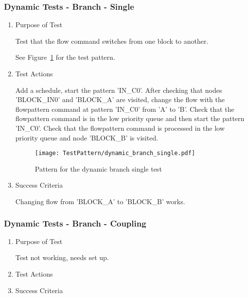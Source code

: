 \subsubsection{Dynamic Tests - Branch - Single}
\begin{enumerate}
	\item Purpose of Test

	Test that the flow command switches from one block to another.

	See Figure~\ref{fig:Pattern_for_the_dynamic_branch_single_test} for the test pattern.
	\item Test Actions

	Add a schedule, start the pattern 'IN\_C0'. After checking that nodes 'BLOCK\_IN0' and 'BLOCK\_A' are visited, 
        change the flow with the flowpattern command at pattern 'IN\_C0' from 'A' to 'B'. Check that the flowpattern 
        command is in the low priority queue and then start the pattern 'IN\_C0'. Check that the flowpattern 
        command is processed in the low priority queue and node 'BLOCK\_B' is visited.
    \begin{figure}
        \centering 
        \texttt{[image: TestPattern/dynamic\_branch\_single.pdf]}
        \caption{Pattern for the dynamic branch single test}
        \label{fig:Pattern_for_the_dynamic_branch_single_test}
    \end{figure}
	\item Success Criteria

	Changing flow from 'BLOCK\_A' to 'BLOCK\_B' works.
\end{enumerate}
\subsubsection{Dynamic Tests - Branch - Coupling}
\begin{enumerate}
	\item Purpose of Test

	Test not working, needs set up.
	\item Test Actions
	\item Success Criteria
\end{enumerate}
